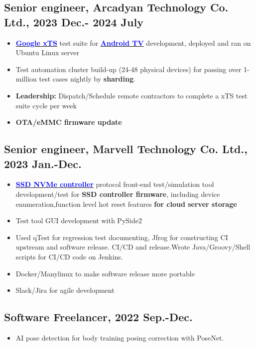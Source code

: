 \documentclass[11pt]{article}
\begin{document}
\begin{multicols*}{2}
\begin{experiencebox}
\subsection*{Senior engineer, Arcadyan Technology Co. Ltd., 2023 Dec.- 2024 July }
\begin{itemize}[noitemsep]
    \item \href{https://source.android.com/docs/compatibility/cts}{\textbf{\textcolor{blue}{Google xTS}}} test suite for \href{https://www.arcadyan.com/zh-hant/solutions/idea/stb/}{\textbf{\textcolor{blue}{Android TV}}} development, deployed and ran on Ubuntu Linux server
    \item Test automation cluster build-up (24-48 physical devices) for passing over 1-million test cases nightly by \textbf{sharding}.
    \item \textbf{Leadership:} Dispatch/Schedule remote contractors to complete a xTS test suite cycle per week
    \item \textbf{OTA/eMMC firmware update}
\end{itemize}

\vspace{0.3em}

\subsection*{Senior engineer, Marvell Technology Co. Ltd., 2023 Jan.-Dec.}
\begin{itemize}[noitemsep]
    \item \href{https://www.marvell.com/embedded-processors/armada-cp/}{\textbf{\textcolor{blue}{SSD NVMe controller}}} protocol front-end test/simulation tool development/test for \textbf{SSD controller firmware}, including device enumeration,function level hot reset features\textbf{ for cloud server storage}
    \item Test tool GUI development with PySide2
    \item Used qTest for regression test documenting, Jfrog for constructing CI upstream and software release. CI/CD and release.Wrote Java/Groovy/Shell scripts for CI/CD code on Jenkins.
    \item Docker/Manylinux to make software release more portable
    \item Slack/Jira for agile development
\end{itemize}

\vspace{0.3em}

\subsection*{Software Freelancer, 2022 Sep.-Dec.}
\begin{itemize}[noitemsep]
    \item AI pose detection for body training posing correction with PoseNet.
\end{itemize}


\end{experiencebox}
\end{multicols*}
\end{document}
